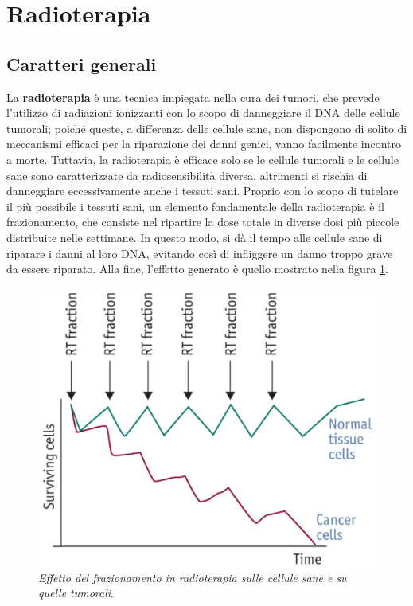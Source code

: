 \documentclass{report}
\newcommand{\figref}[1]{figura \ref{#1}}
\numberwithin{equation}{section}
\numberwithin{figure}{section}
\begin{document}
\section{Radioterapia}

\subsection{Caratteri generali}
La \textbf{radioterapia} è una tecnica impiegata nella cura dei tumori, che prevede l'utilizzo di radiazioni ionizzanti con lo scopo di danneggiare il DNA delle cellule tumorali; poiché queste, a differenza delle cellule sane, non dispongono di solito di meccanismi efficaci per la riparazione dei danni genici, vanno facilmente incontro a morte. Tuttavia, la radioterapia è efficace solo se le cellule tumorali e le cellule sane sono caratterizzate da radiosensibilità diversa, altrimenti si rischia di danneggiare eccessivamente anche i tessuti sani. Proprio con lo scopo di tutelare il più possibile i tessuti sani, un elemento fondamentale della radioterapia è il frazionamento, che consiste nel ripartire la dose totale in diverse dosi più piccole distribuite nelle settimane. In questo modo, si dà il tempo alle cellule sane di riparare i danni al loro DNA, evitando così di infliggere un danno troppo grave da essere riparato. Alla fine, l'effetto generato è quello mostrato nella \figref{fig:frazionamento}.

\begin{figure}[htp]
\centering
\includegraphics[scale=0.4]{immagini/frazionamento.png}
\caption{\label{fig:frazionamento} \textit{Effetto del frazionamento in radioterapia sulle cellule sane e su quelle tumorali}.}
\end{figure}
\end{document}
